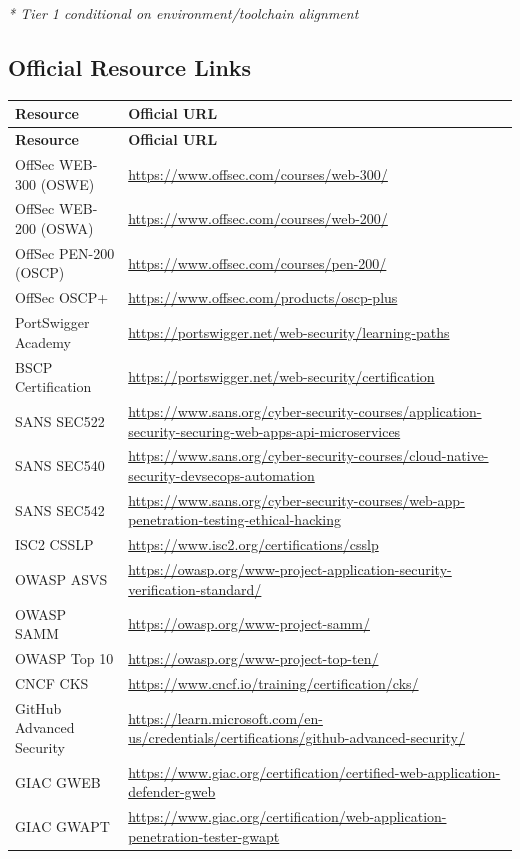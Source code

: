\documentclass[11pt,letterpaper]{article}
\begin{document}
\textit{* Tier 1 conditional on environment/toolchain alignment}

\subsection{Official Resource Links}

\begin{longtable}{p{4cm} p{9cm}}
\toprule
\textbf{Resource} & \textbf{Official URL} \\
\midrule
\endfirsthead
\toprule
\textbf{Resource} & \textbf{Official URL} \\
\midrule
\endhead
\bottomrule
\endlastfoot
OffSec WEB-300 (OSWE) & \url{https://www.offsec.com/courses/web-300/} \\
OffSec WEB-200 (OSWA) & \url{https://www.offsec.com/courses/web-200/} \\
OffSec PEN-200 (OSCP) & \url{https://www.offsec.com/courses/pen-200/} \\
OffSec OSCP+ & \url{https://www.offsec.com/products/oscp-plus} \\
PortSwigger Academy & \url{https://portswigger.net/web-security/learning-paths} \\
BSCP Certification & \url{https://portswigger.net/web-security/certification} \\
SANS SEC522 & \url{https://www.sans.org/cyber-security-courses/application-security-securing-web-apps-api-microservices} \\
SANS SEC540 & \url{https://www.sans.org/cyber-security-courses/cloud-native-security-devsecops-automation} \\
SANS SEC542 & \url{https://www.sans.org/cyber-security-courses/web-app-penetration-testing-ethical-hacking} \\
ISC2 CSSLP & \url{https://www.isc2.org/certifications/csslp} \\
OWASP ASVS & \url{https://owasp.org/www-project-application-security-verification-standard/} \\
OWASP SAMM & \url{https://owasp.org/www-project-samm/} \\
OWASP Top 10 & \url{https://owasp.org/www-project-top-ten/} \\
CNCF CKS & \url{https://www.cncf.io/training/certification/cks/} \\
GitHub Advanced Security & \url{https://learn.microsoft.com/en-us/credentials/certifications/github-advanced-security/} \\
GIAC GWEB & \url{https://www.giac.org/certification/certified-web-application-defender-gweb} \\
GIAC GWAPT & \url{https://www.giac.org/certification/web-application-penetration-tester-gwapt} \\
\end{longtable}
\end{document}
